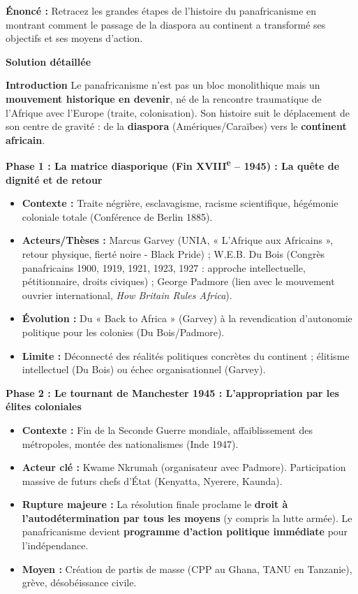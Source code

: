 \documentclass[11pt]{article}
\newcommand{\cle}[1]{{\popxbold\color{popdark}#1}}
\begin{document}
\begin{exoresolu}
\textbf{Énoncé :} Retracez les grandes étapes de l'histoire du panafricanisme en montrant comment le passage de la diaspora au continent a transformé ses objectifs et ses moyens d'action.

\tcblower
\textbf{Solution détaillée}

\textbf{Introduction}
Le panafricanisme n'est pas un bloc monolithique mais un \textbf{mouvement historique en devenir}, né de la rencontre traumatique de l'Afrique avec l'Europe (traite, colonisation). Son histoire suit le déplacement de son centre de gravité : de la \textbf{diaspora} (Amériques/Caraïbes) vers le \textbf{continent africain}.

\textbf{Phase 1 : La matrice diasporique (Fin XVIII\textsuperscript{e} – 1945) : La quête de dignité et de retour}
\begin{itemize}
    \item \textbf{Contexte :} Traite négrière, esclavagisme, racisme scientifique, hégémonie coloniale totale (Conférence de Berlin 1885).
    \item \textbf{Acteurs/Thèses :} \cle{Marcus Garvey} (UNIA, « L'Afrique aux Africains », retour physique, fierté noire - \cle{Black Pride}) ; \cle{W.E.B. Du Bois} (Congrès panafricains 1900, 1919, 1921, 1923, 1927 : approche intellectuelle, pétitionnaire, droits civiques) ; \cle{George Padmore} (lien avec le mouvement ouvrier international, \emph{How Britain Rules Africa}).
    \item \textbf{Évolution :} Du « Back to Africa » (Garvey) à la revendication d'autonomie politique pour les colonies (Du Bois/Padmore).
    \item \textbf{Limite :} Déconnecté des réalités politiques concrètes du continent ; élitisme intellectuel (Du Bois) ou échec organisationnel (Garvey).
\end{itemize}

\textbf{Phase 2 : Le tournant de Manchester 1945 : L'appropriation par les élites coloniales}
\begin{itemize}
    \item \textbf{Contexte :} Fin de la Seconde Guerre mondiale, affaiblissement des métropoles, montée des nationalismes (Inde 1947).
    \item \textbf{Acteur clé :} \cle{Kwame Nkrumah} (organisateur avec Padmore). Participation massive de futurs chefs d'État (Kenyatta, Nyerere, Kaunda).
    \item \textbf{Rupture majeure :} La résolution finale proclame le \textbf{droit à l'autodétermination par tous les moyens} (y compris la lutte armée). Le panafricanisme devient \textbf{programme d'action politique immédiate} pour l'indépendance.
    \item \textbf{Moyen :} Création de partis de masse (CPP au Ghana, TANU en Tanzanie), grève, désobéissance civile.
\end{itemize}


\end{exoresolu}
\end{document}
